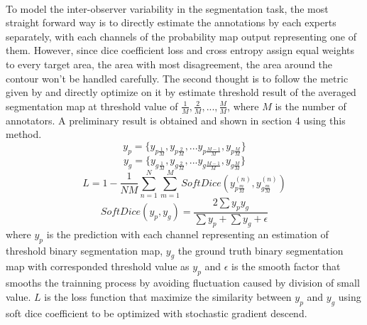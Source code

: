\documentclass[12pt]{extarticle}
\begin{document}
\paragraph{}
To model the inter-observer variability in the segmentation task, the most straight forward way is to 
directly estimate the annotations by each experts separately, with each channels of 
the probability map output representing one of them. However, since dice coefficient loss and cross entropy 
assign equal weights to every target area, the area with most disagreement, 
the area around the contour won't be handled carefully\cite{Kervadec_2021}.
The second thought is to follow the metric given by \cite{qubiq} and directly optimize on it by estimate threshold 
result of the averaged segmentation map at threshold value of $\frac{1}{M}, \frac{2}{M}, ..., \frac{M}{M}$, 
where $M$ is the number of annotators. A preliminary result is obtained and shown in section 4 using this method.
\begin{equation}
    y_{p} = \{y_{p\frac{1}{M}}, y_{p\frac{2}{M}}, ... y_{p\frac{M-1}{M}},y_{p\frac{M}{M}}\}
\end{equation}
\begin{equation}
    y_{g} = \{y_{g\frac{1}{M}}, y_{g\frac{2}{M}}, ... y_{g\frac{M-1}{M}},y_{g\frac{M}{M}}\}
\end{equation}
\begin{equation}
    L = 1 - \frac{1}{NM}\sum_{n=1}^{N}\sum_{m=1}^{M}SoftDice(y_{p\frac{m}{M}}^{(n)}, y_{g\frac{m}{M}}^{(n)})
\end{equation}
\begin{equation}
    SoftDice(y_p, y_g) = \frac{2\sum y_p y_g}{\sum y_p +  \sum y_g + \epsilon}
\end{equation}
where $y_p$ is the prediction with each
channel representing an estimation of threshold binary segmentation map, 
$y_g$ the ground truth binary segmentation map with corresponded threshold value as $y_p$ and $\epsilon$ is the 
smooth factor that smooths the trainning process by avoiding fluctuation caused by division of small value.
$L$ is the loss function that maximize the similarity between $y_p$ and $y_g$ using soft dice coefficient 
to be optimized with stochastic gradient descend. 
\end{document}
